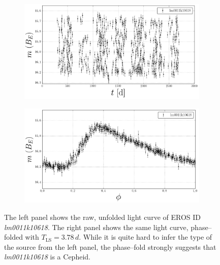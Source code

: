 \begin{figure}[h]
	\centering
	\begin{subfigure}[t]{0.49\textwidth}
		\centering
		\label{fig:lightcurve-unfolded}
		\includegraphics[width=\textwidth]{figures/time-series/lm0011k10618.png}				
	\end{subfigure}
	\begin{subfigure}[t]{0.49\textwidth}
		\centering
		\label{fig:lightcurve-folded}
		\includegraphics[width=\textwidth]{figures/time-series/lm0011k10618-folded.png}				
	\end{subfigure}
	\caption[Raw and pase--folded light curve]{The left panel shows the raw, unfolded light curve of EROS ID \emph{lm0011k10618}. The right panel shows the same light curve, phase--folded with $T_{\text{LS}} = 3.78 \, \unit{d}$. While it is quite hard to infer the type of the source from the left panel, the phase--fold strongly suggests that \emph{lm0011k10618} is a Cepheid.}
	\label{fig:unfolded-folded-light-curve}
\end{figure}


